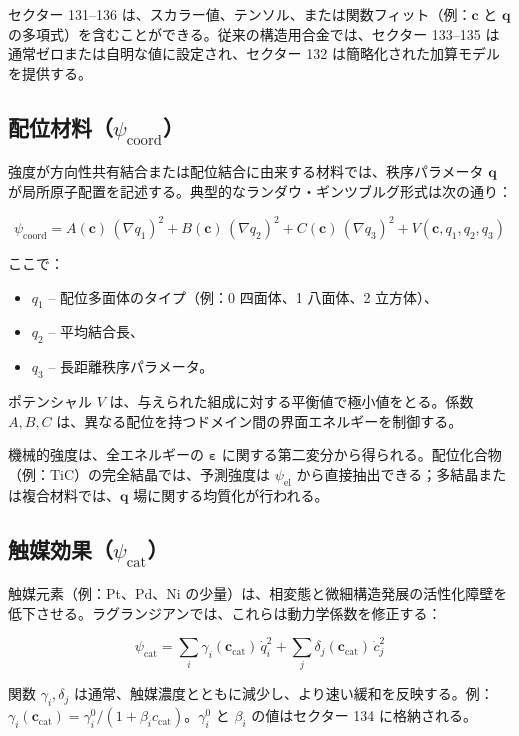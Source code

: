 \documentclass[11pt,a4paper]{article}
\theoremstyle{remark}
\begin{document}
	セクター 131–136 は、スカラー値、テンソル、または関数フィット（例：\(\mathbf{c}\) と \(\mathbf{q}\) の多項式）を含むことができる。従来の構造用合金では、セクター 133–135 は通常ゼロまたは自明な値に設定され、セクター 132 は簡略化された加算モデルを提供する。
	
	\subsection{配位材料（\(\psi_{\mathrm{coord}}\)）}
	\label{subsec:coordination}
	
	強度が方向性共有結合または配位結合に由来する材料では、秩序パラメータ \(\mathbf{q}\) が局所原子配置を記述する。典型的なランダウ・ギンツブルグ形式は次の通り：
	
	\[
	\psi_{\mathrm{coord}} = A(\mathbf{c})\,(\nabla q_1)^2 + B(\mathbf{c})\,(\nabla q_2)^2 + C(\mathbf{c})\,(\nabla q_3)^2 + V(\mathbf{c}, q_1, q_2, q_3)
	\]
	
	ここで：
	\begin{itemize}
		\item \(q_1\) – 配位多面体のタイプ（例：0 四面体、1 八面体、2 立方体）、
		\item \(q_2\) – 平均結合長、
		\item \(q_3\) – 長距離秩序パラメータ。
	\end{itemize}
	
	ポテンシャル \(V\) は、与えられた組成に対する平衡値で極小値をとる。係数 \(A,B,C\) は、異なる配位を持つドメイン間の界面エネルギーを制御する。
	
	機械的強度は、全エネルギーの \(\boldsymbol{\varepsilon}\) に関する第二変分から得られる。配位化合物（例：TiC）の完全結晶では、予測強度は \(\psi_{\mathrm{el}}\) から直接抽出できる；多結晶または複合材料では、\(\mathbf{q}\) 場に関する均質化が行われる。
	
	\subsection{触媒効果（\(\psi_{\mathrm{cat}}\)）}
	\label{subsec:catalysis}
	
	触媒元素（例：Pt、Pd、Ni の少量）は、相変態と微細構造発展の活性化障壁を低下させる。ラグランジアンでは、これらは動力学係数を修正する：
	
	\[
	\psi_{\mathrm{cat}} = \sum_i \gamma_i(\mathbf{c}_{\mathrm{cat}})\, \dot{q}_i^2 + \sum_j \delta_j(\mathbf{c}_{\mathrm{cat}})\, \dot{c}_j^2
	\]
	
	関数 \(\gamma_i, \delta_j\) は通常、触媒濃度とともに減少し、より速い緩和を反映する。例：\(\gamma_i(\mathbf{c}_{\mathrm{cat}}) = \gamma_i^0 / (1 + \beta_i c_{\mathrm{cat}})\)。\(\gamma_i^0\) と \(\beta_i\) の値はセクター 134 に格納される。
	
\end{document}
